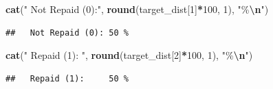 \documentclass[
]{article}
\newenvironment{Shaded}{\begin{snugshade}}{\end{snugshade}}
\newcommand{\DecValTok}[1]{\textcolor[rgb]{0.00,0.00,0.81}{#1}}
\newcommand{\FunctionTok}[1]{\textcolor[rgb]{0.13,0.29,0.53}{\textbf{#1}}}
\newcommand{\NormalTok}[1]{#1}
\newcommand{\SpecialCharTok}[1]{\textcolor[rgb]{0.81,0.36,0.00}{\textbf{#1}}}
\newcommand{\StringTok}[1]{\textcolor[rgb]{0.31,0.60,0.02}{#1}}
\begin{document}
\begin{Shaded}
\begin{Highlighting}[]
\FunctionTok{cat}\NormalTok{(}\StringTok{"  Not Repaid (0):"}\NormalTok{, }\FunctionTok{round}\NormalTok{(target\_dist[}\DecValTok{1}\NormalTok{]}\SpecialCharTok{*}\DecValTok{100}\NormalTok{, }\DecValTok{1}\NormalTok{), }\StringTok{"\%}\SpecialCharTok{\textbackslash{}n}\StringTok{"}\NormalTok{)}
\end{Highlighting}
\end{Shaded}

\begin{verbatim}
##   Not Repaid (0): 50 %
\end{verbatim}

\begin{Shaded}
\begin{Highlighting}[]
\FunctionTok{cat}\NormalTok{(}\StringTok{"  Repaid (1):    "}\NormalTok{, }\FunctionTok{round}\NormalTok{(target\_dist[}\DecValTok{2}\NormalTok{]}\SpecialCharTok{*}\DecValTok{100}\NormalTok{, }\DecValTok{1}\NormalTok{), }\StringTok{"\%}\SpecialCharTok{\textbackslash{}n}\StringTok{"}\NormalTok{)}
\end{Highlighting}
\end{Shaded}

\begin{verbatim}
##   Repaid (1):     50 %
\end{verbatim}
\end{document}

